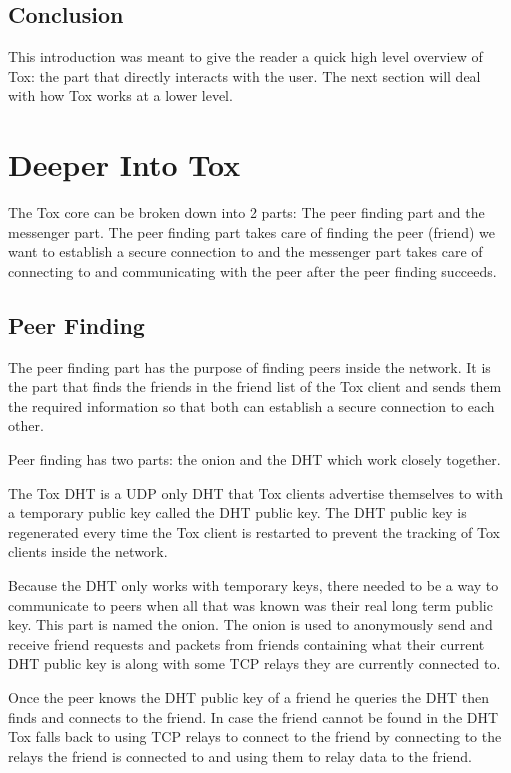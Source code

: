 \documentclass{tox}
\begin{document}
\subsection{Conclusion}

This introduction was meant to give the reader a quick high level overview of 
Tox: the part that directly interacts with the user. The next section will deal 
with how Tox works at a lower level.

\section{Deeper Into Tox}

The Tox core can be broken down into 2 parts: The peer finding part and the 
messenger part. The peer finding part takes care of finding the peer (friend) 
we 
want to establish a secure connection to and the messenger part takes care of 
connecting to and communicating with the peer after the peer finding succeeds.

\subsection{Peer Finding}

The peer finding part has the purpose of finding peers inside the network. It 
is the part that finds the friends in the friend list of the Tox client and 
sends them the required information so that both can establish a secure 
connection to each other.

Peer finding has two parts: the onion and the DHT which work closely together.

The Tox DHT is a UDP only DHT that Tox clients advertise themselves to with a 
temporary public key called the DHT public key. The DHT public key is 
regenerated every time the Tox client is restarted to prevent the tracking of 
Tox clients inside the network.

Because the DHT only works with temporary keys, there needed to be a way to 
communicate to peers when all that was known was their real long term public 
key. This part is named the onion. The onion is used to anonymously send and 
receive friend requests and packets from friends containing what their current 
DHT public key is along with some TCP relays they are currently connected to.

Once the peer knows the DHT public key of a friend he queries the DHT then 
finds and connects to the friend. In case the friend cannot be found in the DHT 
Tox falls back to using TCP relays to connect to the friend by connecting to 
the relays the friend is connected to and using them to relay data to the 
friend.
\end{document}
